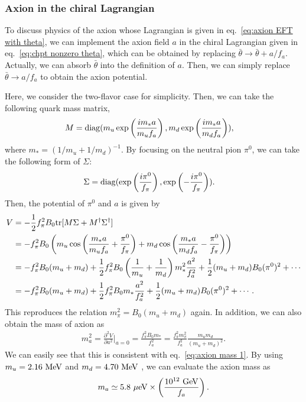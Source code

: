 \documentclass[11pt,a4paper]{article}
\begin{document}
\subsubsection{Axion in the chiral Lagrangian}
To discuss physics of the axion whose Lagrangian is given in eq.~\eqref{eq:axion EFT with theta}, we can implement the axion field $a$ in the chiral Lagrangian given in eq.~\eqref{eq:chpt nonzero theta}, which can be obtained by replacing $\bar\theta \to \bar\theta + a/f_a$.
Actually, we can absorb $\bar\theta$ into the definition of $a$. Then, we can simply replace $\bar\theta \to a/f_a$ to obtain the axion potential.

Here, we consider the two-flavor case for simplicity. Then, we can take the following quark mass matrix,
\begin{align}
    M &= {\rm diag}(m_u \exp\left( \frac{i m_* a}{m_u f_a}\right), m_d \exp\left( \frac{i m_* a}{m_d f_a}\right)),
\end{align}
where $m_* = (1/m_u + 1/m_d)^{-1}$.
By focusing on the neutral pion $\pi^0$, we can take the following form of $\Sigma$:
\begin{align}
    \Sigma &= {\rm diag}(\exp\left(\frac{i\pi^0}{f_\pi}\right), \exp\left(-\frac{i\pi^0}{f_\pi}\right)).
\end{align}
Then, the potential of $\pi^0$ and $a$ is given by
\begin{align}
    V
    &= -\frac{1}{2} f_\pi^2 B_0 {\rm tr}[M \Sigma + M^\dagger \Sigma^\dagger] \nonumber\\
    &= -f_\pi^2 B_0 \left( m_u \cos\left(\frac{m_* a}{m_u f_a} + \frac{\pi^0}{f_\pi}\right) + m_d \cos\left(\frac{m_* a}{m_d f_a} - \frac{\pi^0}{f_\pi}\right) \right) \nonumber\\
    &= -f_\pi^2 B_0 (m_u + m_d) + \frac{1}{2} f_\pi^2 B_0 \left( \frac{1}{m_u} + \frac{1}{m_d} \right) m_*^2 \frac{a^2}{f_a^2} + \frac{1}{2} (m_u + m_d) B_0  (\pi^0)^2 + \cdots \nonumber\\
    &= -f_\pi^2 B_0 (m_u + m_d) + \frac{1}{2} f_\pi^2 B_0 m_* \frac{a^2}{f_a^2} + \frac{1}{2} (m_u + m_d) B_0  (\pi^0)^2 + \cdots.
\end{align}
This reproduces the relation $m_\pi^2 = B_0 (m_u + m_d)$ again. In addition, we can also obtain the mass of axion as
\begin{align}
    m_a^2 = \frac{\partial^2 V}{\partial a^2}\biggr|_{a=0} = \frac{f_\pi^2 B_0 m_*}{f_a^2} = \frac{f_\pi^2 m_\pi^2}{f_a^2} \frac{m_u m_d}{(m_u + m_d)^2}. \label{eq:axion mass 2}
\end{align}
We can easily see that this is consistent with eq.~\eqref{eq:axion mass 1}. By using $m_u = 2.16~{\rm MeV}$ and $m_d = 4.70~{\rm MeV}$ \cite{ParticleDataGroup:2024cfk}, we can evaluate the axion mass as
\begin{align}
    m_a \simeq 5.8~{\rm \mu eV} \times \left( \frac{10^{12}~{\rm GeV}}{f_a} \right).
\end{align}
\end{document}
